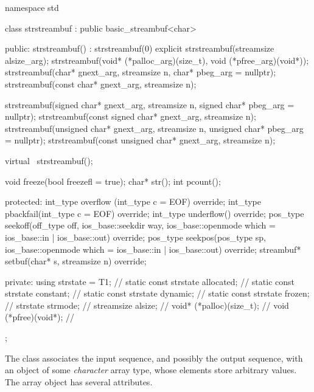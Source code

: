 %
\begin{codeblock}
namespace std {
  class strstreambuf : public basic_streambuf<char> {
  public:
    strstreambuf() : strstreambuf(0) {}
    explicit strstreambuf(streamsize alsize_arg);
    strstreambuf(void* (*palloc_arg)(size_t), void (*pfree_arg)(void*));
    strstreambuf(char* gnext_arg, streamsize n, char* pbeg_arg = nullptr);
    strstreambuf(const char* gnext_arg, streamsize n);

    strstreambuf(signed char* gnext_arg, streamsize n,
                 signed char* pbeg_arg = nullptr);
    strstreambuf(const signed char* gnext_arg, streamsize n);
    strstreambuf(unsigned char* gnext_arg, streamsize n,
                 unsigned char* pbeg_arg = nullptr);
    strstreambuf(const unsigned char* gnext_arg, streamsize n);

    virtual ~strstreambuf();

    void  freeze(bool freezefl = true);
    char* str();
    int   pcount();

  protected:
    int_type overflow (int_type c = EOF) override;
    int_type pbackfail(int_type c = EOF) override;
    int_type underflow() override;
    pos_type seekoff(off_type off, ios_base::seekdir way,
                     ios_base::openmode which
                      = ios_base::in | ios_base::out) override;
    pos_type seekpos(pos_type sp,
                     ios_base::openmode which
                      = ios_base::in | ios_base::out) override;
    streambuf* setbuf(char* s, streamsize n) override;

  private:
    using strstate = T1;                // \expos
    static const strstate allocated;    // \expos
    static const strstate constant;     // \expos
    static const strstate dynamic;      // \expos
    static const strstate frozen;       // \expos
    strstate strmode;                   // \expos
    streamsize alsize;                  // \expos
    void* (*palloc)(size_t);            // \expos
    void (*pfree)(void*);               // \expos
  };
}
\end{codeblock}

\pnum
The class
associates the input sequence, and possibly the output sequence, with an object of some
\textit{character}
array type, whose elements store arbitrary values.
The array object has several attributes.

